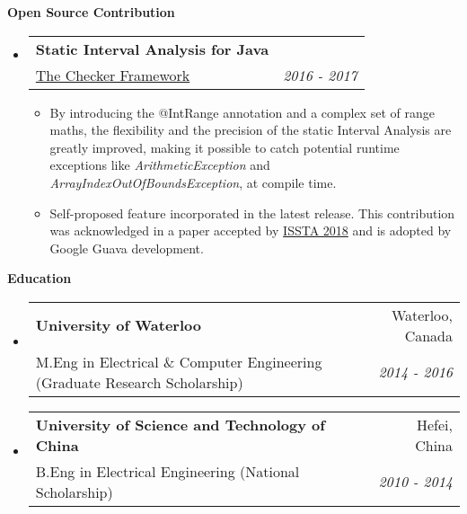 \documentclass[letterpaper,10pt]{article}
\makeatletter
\newcommand{\resitem}[1]{\item #1 \vspace{-2pt}}
\newcommand{\resheading}[1]{{\large \colorbox{mygrey}{\begin{minipage}{\textwidth}{\textbf{#1 \vphantom{p\^{E}}}}\end{minipage}}}}
\newcommand{\ressubheading}[4]{
\begin{tabular*}{7.0in}{l@{\extracolsep{\fill}}r}
    \textbf{#1} & #2 \\
    #3 & \textit{#4} \\
\end{tabular*}\vspace{-6pt}}
\makeatother
\begin{document}
\resheading{Open Source Contribution}
\begin{itemize}
\itemsep0em
\item
	\ressubheading{Static Interval Analysis for Java}{}{\href{https://github.com/typetools/checker-framework}{The Checker Framework}}{2016 - 2017}
	\begin{itemize}
        \resitem{By introducing the @IntRange annotation and a complex set of range maths, the flexibility and the precision of the static Interval Analysis are greatly improved, making it possible to catch potential runtime exceptions like \textit{ArithmeticException} and \textit{ArrayIndexOutOfBoundsException}, at compile time.}
        \resitem{Self-proposed feature incorporated in the latest release. This contribution was acknowledged in a paper accepted by \href{https://homes.cs.washington.edu/~mernst/pubs/array-indexing-issta2018.pdf}{ISSTA 2018} and is adopted by Google Guava development. }
	\end{itemize}
	
\end{itemize}

\resheading{Education}
\begin{itemize}
\itemsep0em
\item
	\ressubheading{University of Waterloo}{Waterloo, Canada}{M.Eng in Electrical \& Computer Engineering (Graduate Research Scholarship)}{2014 - 2016}
	\begin{itemize}
	\end{itemize}
\item
	\ressubheading{University of Science and Technology of China}{Hefei, China}{B.Eng in Electrical Engineering (National Scholarship)}{2010 - 2014}

\end{itemize}
\end{document}
